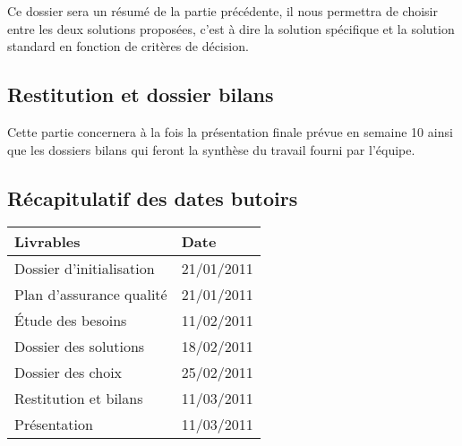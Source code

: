 Ce dossier sera un résumé de la partie précédente, il nous permettra de choisir
entre les deux solutions proposées, c'est à dire la solution spécifique et la
solution standard en fonction de critères de décision. 

\subsection{Restitution et dossier bilans}

Cette partie concernera à la fois la présentation finale prévue en semaine 10
ainsi que les dossiers bilans qui feront la synthèse du travail fourni par l'équipe.

\subsection{Récapitulatif des dates butoirs}

\begin{longtable}{|l|l|}
\hline
Livrables& Date\\
\endhead \hline
Dossier d'initialisation& 21/01/2011\\
\hline
Plan d'assurance qualité& 21/01/2011\\
\hline
Étude des besoins& 11/02/2011\\
\hline
Dossier des solutions& 18/02/2011\\
\hline
Dossier des choix& 25/02/2011\\
\hline
Restitution et bilans& 11/03/2011\\
\hline
Présentation&  11/03/2011\\
\hline
\end{longtable}

